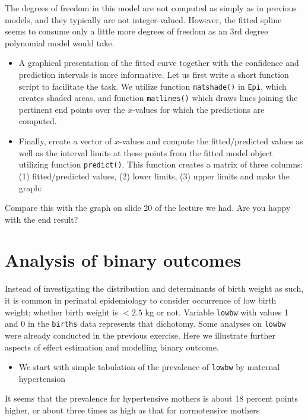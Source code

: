 \documentclass[
]{book}
\providecommand{\tightlist}{%
  \setlength{\itemsep}{0pt}\setlength{\parskip}{0pt}}
\begin{document}
The degrees of freedom in this model are not computed as simply as in previous
models, and they typically are not integer-valued. However,
the fitted spline seems to consume only a little more degrees of freedom
as an 3rd degree polynomial model would take.

\begin{itemize}
\item
  A graphical presentation of the fitted curve together with the
  confidence and prediction intervals is more informative.
  Let us first write a
  short function script to facilitate the task. We utilize function \texttt{matshade()}
  in \texttt{Epi}, which creates shaded areas, and function \texttt{matlines()} which draws
  lines joining the pertinent end points over the \(x\)-values for which the
  predictions are computed.
\item
  Finally, create a vector of \(x\)-values and compute
  the fitted/predicted values as well
  as the interval limits at these points from the fitted
  model object utilizing
  function \texttt{predict()}.
  This function creates a matrix of three columns: (1) fitted/predicted
  values, (2) lower limits, (3) upper limits and
  make the graph:
\end{itemize}

Compare this with the graph on slide 20 of the lecture we had.
Are you happy with the end result?

\section{Analysis of binary outcomes}\label{analysis-of-binary-outcomes}

Instead of investigating the distribution and determinants
of birth weight as such, it is common in perinatal
epidemiology to consider
occurrence of low birth weight; whether birth weight is
\(< 2.5\) kg or not. Variable \texttt{lowbw} with values 1 and 0
in the \texttt{births} data represents that dichotomy.
Some analyses on \texttt{lowbw} were already conducted
in the previous exercise. Here we illustrate further
aspects of effect estimation
and modelling binary outcome.

\begin{itemize}
\tightlist
\item
  We start with simple tabulation
  of the prevalence of \texttt{lowbw} by maternal hypertension
\end{itemize}

It seems that the prevalence for hypertensive mothers
is about 18 percent points higher,
or about three times as high as that for normotensive mothers
\end{document}
